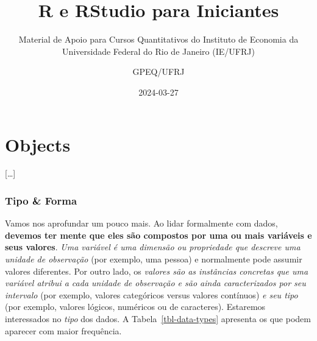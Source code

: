\documentclass[
  letterpaper,
  DIV=11,
  numbers=noendperiod]{scrreprt}
\title{R e RStudio para Iniciantes}
\subtitle{Material de Apoio para Cursos Quantitativos do Instituto de
Economia da Universidade Federal do Rio de Janeiro (IE/UFRJ)}
\author{GPEQ/UFRJ}
\date{2024-03-27}
\renewcommand*\contentsname{Índice}
\newcommand\contentsname{Índice}
\begin{document}
\maketitle

\renewcommand*\contentsname{Índice}
{
\hypersetup{linkcolor=}
\setcounter{tocdepth}{2}
\tableofcontents
}

\chapter{Objects}\label{objects}

{[}\ldots{]}

\subsection{Tipo \& Forma}\label{tipo-forma}

Vamos nos aprofundar um pouco mais. Ao lidar formalmente com dados,
\textbf{devemos ter mente que eles são compostos por uma ou mais
variáveis e seus valores}. \emph{Uma variável é uma dimensão ou
propriedade que descreve uma unidade de observação} (por exemplo, uma
pessoa) e normalmente pode assumir valores diferentes. Por outro lado,
os \emph{valores são as instâncias concretas que uma variável atribui a
cada unidade de observação e são ainda caracterizados por seu intervalo}
(por exemplo, valores categóricos versus valores contínuos) \emph{e seu
tipo} (por exemplo, valores lógicos, numéricos ou de caracteres).
Estaremos interessados no \emph{tipo} dos dados. A
Tabela~\ref{tbl-data-types} apresenta os que podem aparecer com maior
frequência.
\end{document}

